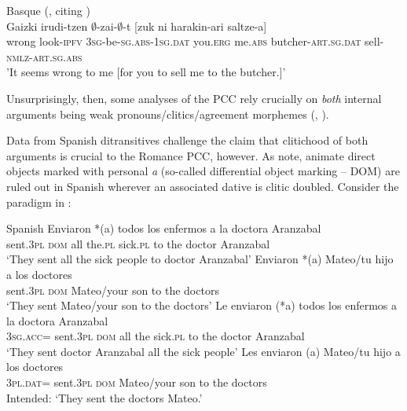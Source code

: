 \documentclass[output=paper,colorlinks,citecolor=brown,nonflat]{./langscibook}
\begin{document}
\ea%
    \label{ex:sheehan:10}
    Basque (\citealt[7]{Preminger2019}, citing \citealt[98]{Laka1996})\\
    \gll    Gaizki   irudi-tzen ${\emptyset}$-zai-${\emptyset}$-t         [zuk ni harakin-ari    saltze-a]\\
          wrong   look-\textsc{ipfv} \textsc{3sg}-be-\textsc{sg}.\textsc{abs}{}-\textsc{1sg}.\textsc{dat}  {\db}you.\textsc{erg}    me.\textsc{abs} butcher-\textsc{art.sg}.\textsc{dat} sell-\textsc{nmlz-art.sg.abs}\\
    \glt 'It seems wrong to me [for you to sell me to the butcher.]' 
\z

Unsurprisingly, then, some analyses of the PCC rely crucially on \textit{both} internal arguments being weak pronouns/clitics/agreement morphemes (\citealt{Bianchi2006}, \citealt{Stegovec2017}). 

Data from Spanish ditransitives challenge the claim that clitichood of both arguments is crucial to the Romance PCC, however. As \citet{OrmazabalRomero2013Borealis} note, animate direct objects marked with personal \textit{a} (so-called differential object marking – DOM) are ruled out in Spanish wherever an associated dative is clitic doubled. Consider the paradigm in :

\ea%
    \label{ex:sheehan:11}
    Spanish \citep[224]{OrmazabalRomero2013Borealis}
    \ea\label{ex:sheehan:11a}
    \gll   Enviaron   *(a)   todos los   enfermos a   la   doctora   Aranzabal\\
        sent.\textsc{3pl}  \textsc{dom}   all   the.\textsc{pl}   sick.\textsc{pl}  to   the   doctor   Aranzabal\\
    \glt ‘They sent all the sick people to doctor Aranzabal’
    \ex\label{ex:sheehan:11b}
    \gll   Enviaron  *(a)   Mateo/tu   hijo   a   los   doctores\\
        sent.\textsc{3pl}  \textsc{dom}   Mateo/your   son   to   the   doctors\\
    \glt ‘They sent Mateo/your son to the doctors’ 
    \ex\label{ex:sheehan:11c}
    \gll   Le   enviaron   (*a)  todos   los  enfermos   a  la  doctora   Aranzabal\\
        \textsc{3sg.acc=} sent.\textsc{3pl}   \textsc{dom}   all   the sick.\textsc{pl}   to   the doctor Aranzabal\\
    \glt ‘They sent doctor Aranzabal all the sick people’
    \ex\label{ex:sheehan:11d}
    \gll    *Les   enviaron   (a)   Mateo/tu   hijo  a   los   doctores\\
        \textsc{3pl.dat}=  sent.\textsc{3pl}   \textsc{dom}   Mateo/your   son   to   the   doctors\\
    \glt Intended: ‘They sent the doctors Mateo.’
    \z
\z
\end{document}
